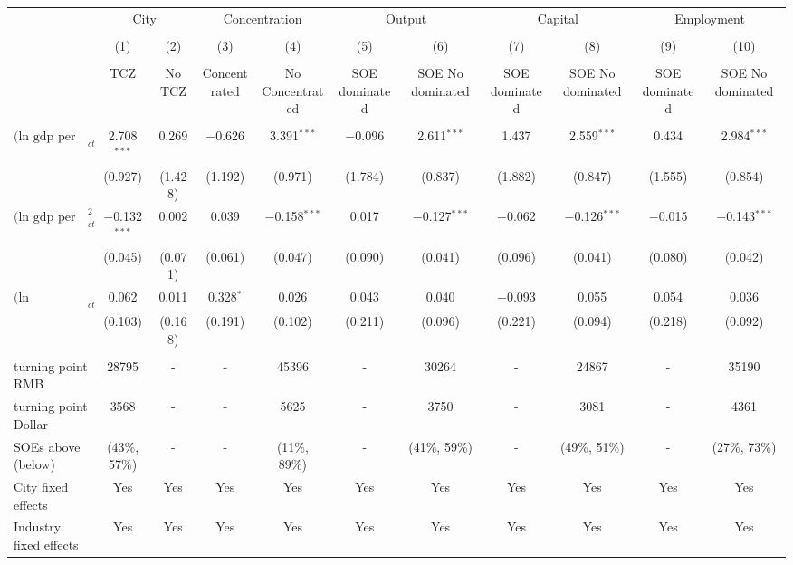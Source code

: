 \documentclass[12pt]{article}
\begin{document}
\begin{sidewaystable}
\begin{adjustbox}{width=\textwidth, totalheight=\baselineskip,keepaspectratio}
\begin{tabular}{@{\extracolsep{5pt}}lcccccccccc}
\\[-1.8ex]
            &\multicolumn{2}{c}{City}&\multicolumn{2}{c}{Concentration}&\multicolumn{2}{c}{Output}&\multicolumn{2}{c}{Capital}&\multicolumn{2}{c}{Employment}\\
\\[-1.8ex] & (1) & (2) & (3) & (4) & (5) & (6) & (7) & (8) & (9) & (10)\\
 \\[-1.8ex]& TCZ & No TCZ & Concentrated & No Concentrated & SOE dominated & SOE No dominated & SOE dominated & SOE No dominated & SOE dominated & SOE No dominated\\
 \hline \\[-1.8ex] 
  $\text{(ln gdp per cap)}_{ct}$  & 2.708$^{***}$ & 0.269 & $-$0.626 & 3.391$^{***}$ & $-$0.096 & 2.611$^{***}$ & 1.437 & 2.559$^{***}$ & 0.434 & 2.984$^{***}$ \\ 
  & (0.927) & (1.428) & (1.192) & (0.971) & (1.784) & (0.837) & (1.882) & (0.847) & (1.555) & (0.854) \\ 
   $\text{(ln gdp per cap)}^2_{ct}$  & $-$0.132$^{***}$ & 0.002 & 0.039 & $-$0.158$^{***}$ & 0.017 & $-$0.127$^{***}$ & $-$0.062 & $-$0.126$^{***}$ & $-$0.015 & $-$0.143$^{***}$ \\ 
  & (0.045) & (0.071) & (0.061) & (0.047) & (0.090) & (0.041) & (0.096) & (0.041) & (0.080) & (0.042) \\ 
   $\text{(ln population)}_{ct}$  & 0.062 & 0.011 & 0.328$^{*}$ & 0.026 & 0.043 & 0.040 & $-$0.093 & 0.055 & 0.054 & 0.036 \\ 
  & (0.103) & (0.168) & (0.191) & (0.102) & (0.211) & (0.096) & (0.221) & (0.094) & (0.218) & (0.092) \\ 
 \hline \\[-1.8ex] 
turning point RMB & 28795 & - & - & 45396 & - & 30264 & - & 24867 & - & 35190 \\ 
turning point Dollar & 3568 & - & - & 5625 & - & 3750 & - & 3081 & - & 4361 \\ 
SOEs above (below) & (43\%, 57\%) & - & - & (11\%, 89\%)  & - & (41\%, 59\%)  & - & (49\%, 51\%) & - & (27\%, 73\%)  \\ 
City fixed effects & Yes & Yes & Yes & Yes & Yes & Yes & Yes & Yes & Yes & Yes \\ 
Industry fixed effects & Yes & Yes & Yes & Yes & Yes & Yes & Yes & Yes & Yes & Yes \\ 

\end{tabular}
\end{adjustbox}
\end{sidewaystable}
\end{document}
